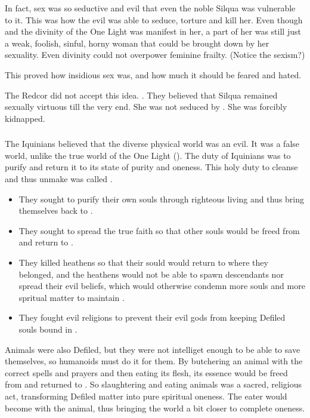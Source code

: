 In fact, sex was so seductive and evil that even the noble Silqua was vulnerable to it. 
This was how the evil  was able to seduce, torture and kill her. 
Even though  and the divinity of the One Light was manifest in her, a part of her was still just a weak, foolish, sinful, horny woman that could be brought down by her sexuality. 
Even divinity could not overpower feminine frailty. 
(Notice the sexism?)

This proved how insidious sex was, and how much it should be feared and hated. 

The Redcor did not accept this idea. 
.
They believed that Silqua remained sexually virtuous till the very end. 
She was not seduced by \Delphine. 
She was forcibly kidnapped. 





\subsubsection{\Tikkun}
The Iquinians believed that the diverse physical world was an evil.
It was a false world, unlike the true world of the One Light (). 
The duty of Iquinians was to purify \Gehinnom and return it to its state of purity and oneness.
This holy duty to cleanse and thus unmake \Gehinnom was called \tikkun.
\begin{itemize}
  \item 
    They sought to purify their own souls through righteous living and thus bring themselves back to \iquin.
  \item 
    They sought to spread the true faith so that other souls would be freed from \Gehinnom and return to \iquin.
  \item 
    They killed heathens so that their sould would return to \itzach where they belonged, and the heathens would not be able to spawn descendants nor spread their evil beliefs, which would otherwise condemn more souls and more spritual matter to maintain \Gehinnom. 
  \item 
    They fought evil religions to prevent their evil gods from keeping Defiled souls bound in \Gehinnom. 
\end{itemize}

Animals were also Defiled, but they were not intelliget enough to be able to save themselves, so humanoids must do it for them.
By butchering an animal with the correct spells and prayers and then eating its flesh, its essence would be freed from \Gehinnom and returned to \iquin. 
So slaughtering and eating animals was a sacred, religious act, transforming Defiled matter into pure spiritual oneness. 
The eater would become  with the animal, thus bringing the world a bit closer to complete oneness.

